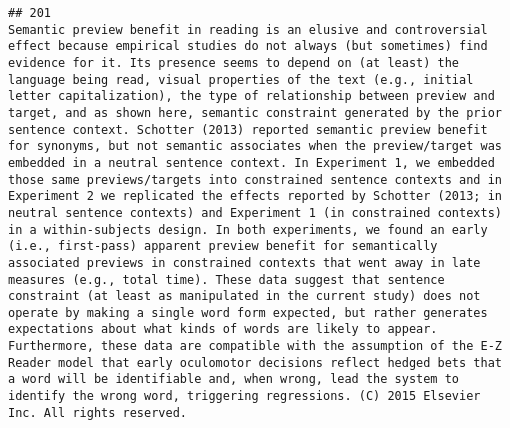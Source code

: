 \documentclass[
  english,
  man]{apa6}
\begin{document}
\begin{verbatim}
## 201                                                                                                                                                                                                                                                                                                                                                                                                                                                                                                                                                                                                                                                                                                                                                                                                                                                                                                                                                                                                                                     Semantic preview benefit in reading is an elusive and controversial effect because empirical studies do not always (but sometimes) find evidence for it. Its presence seems to depend on (at least) the language being read, visual properties of the text (e.g., initial letter capitalization), the type of relationship between preview and target, and as shown here, semantic constraint generated by the prior sentence context. Schotter (2013) reported semantic preview benefit for synonyms, but not semantic associates when the preview/target was embedded in a neutral sentence context. In Experiment 1, we embedded those same previews/targets into constrained sentence contexts and in Experiment 2 we replicated the effects reported by Schotter (2013; in neutral sentence contexts) and Experiment 1 (in constrained contexts) in a within-subjects design. In both experiments, we found an early (i.e., first-pass) apparent preview benefit for semantically associated previews in constrained contexts that went away in late measures (e.g., total time). These data suggest that sentence constraint (at least as manipulated in the current study) does not operate by making a single word form expected, but rather generates expectations about what kinds of words are likely to appear. Furthermore, these data are compatible with the assumption of the E-Z Reader model that early oculomotor decisions reflect hedged bets that a word will be identifiable and, when wrong, lead the system to identify the wrong word, triggering regressions. (C) 2015 Elsevier Inc. All rights reserved.

\end{verbatim}
\end{document}
